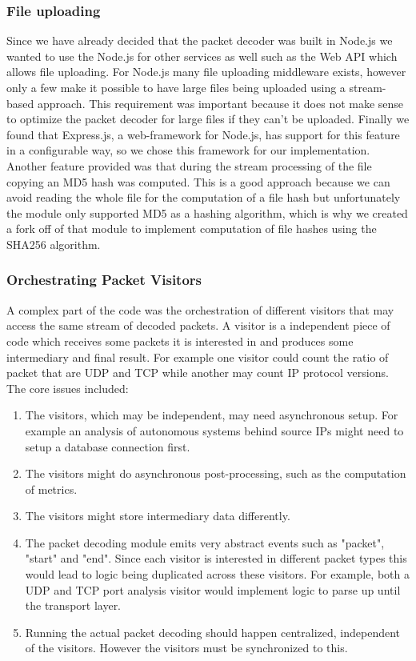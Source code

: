 \subsubsection{File uploading}
Since we have already decided that the packet decoder was built in Node.js we wanted to use the Node.js for other services as well such as the Web API which allows file uploading. For Node.js many file uploading middleware exists, however only a few make it possible to have large files being uploaded using a stream-based approach. This requirement was important because it does not make sense to optimize the packet decoder for large files if they can't be uploaded. Finally we found that Express.js, a web-framework for Node.js, has support for this feature in a configurable way, so we chose this framework for our implementation. Another feature provided was that during the stream processing of the file copying an MD5 hash was computed. This is a good approach because we can avoid reading the whole file for the computation of a file hash but unfortunately the module only supported MD5 as a hashing algorithm, which is why we created a fork off of that module to implement computation of file hashes using the SHA256 algorithm. 

\subsubsection{Orchestrating Packet Visitors}\label{orchestratingpacketvisitors}
A complex part of the code was the orchestration of different visitors that may access the same stream of decoded packets. A visitor is a independent piece of code which receives some packets it is interested in and produces some intermediary and final result. For example one visitor could count the ratio of packet that are UDP and TCP while another may count IP protocol versions. The core issues included:

\begin{enumerate}
    \item The visitors, which may be independent, may need asynchronous setup. For example an analysis of autonomous systems behind source IPs might need to setup a database connection first.
    \item The visitors might do asynchronous post-processing, such as the computation of metrics.
    \item The visitors might store intermediary data differently.
    \item The packet decoding module emits very abstract events such as "packet", "start" and "end". Since each visitor is interested in different packet types this would lead to logic being duplicated across these visitors. For example, both a UDP and TCP port analysis visitor would implement logic to parse up until the transport layer.
    \item Running the actual packet decoding should happen centralized, independent of the visitors. However the visitors must be synchronized to this.
\end{enumerate}{}

